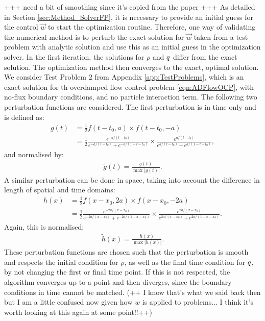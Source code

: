+++ need a bit of smoothing since it's copied from the paper +++
As detailed in Section \ref{sec:Method_SolverFP}, it is necessary to provide an initial guess for the control $\vec{w}$ to start the optimization routine. Therefore, one way of validating the numerical method is to perturb the exact solution for $\vec{w}$ taken from a test problem with analytic solution and use this as an initial guess in the optimization solver. In the first iteration, the solutions for $\rho$ and $q$ differ from the exact solution. The optimization method then converges to the exact, optimal solution. We consider Test Problem 2 from Appendix \ref{app:TestProblems}, which is an exact solution for th overdamped flow control problem \eqref{eqn:ADFlowOCP}, with no-flux boundary conditions, and no particle interaction term. 
The following two perturbation functions are considered. The first perturbation is in time only and is defined as:
\begin{align*}
g(t) &= \frac{1}{2} f(t-t_0, a) \times f(t-t_0, -a)\\
&= \frac{1}{2} \frac{e^{-a/(t-t_0)}}{e^{-a/(t-t_0)} + e^{-a/(1-t -t_0)}} \times \frac{e^{a/(t-t_0)}}{e^{a/(t-t_0)} + e^{a/(1-t - t_0)}},
\end{align*}
and normalised by:
\begin{align*}
\tilde g(t) = \frac{g(t)}{\max{|{g(t)}|}}.
\end{align*}
A similar perturbation can be done in space, taking into account the difference in length of spatial and time domains:
\begin{align*}
h(x) &= \frac{1}{2} f(x-x_0, 2a) \times f(x-x_0, -2a)\\
&= \frac{1}{2} \frac{e^{-2a/(x-x_0)}}{e^{-2a/(x-x_0)} + e^{-2a/(1-x-x_0)}} \times \frac{e^{2a/(x-x_0)}}{e^{2a/(x-x_0)} + e^{2a/(1-x-x_0)}}.
\end{align*}
Again, this is normalised:
\begin{align*}
\tilde h(x) = \frac{h(x)}{\max{|{h(x)}|}}.
\end{align*}
These perturbation functions are chosen such that the perturbation is smooth and respects the initial condition for $\rho$, as well as the final time condition for $q$, by not changing the first or final time point. If this is not respected, the algorithm converges up to a point and then diverges, since the boundary conditions in time cannot be matched. (++ I know that's what we said back then but I am a little confused now given how $w$ is applied to problems... I think it's worth looking at this again at some point!!++)
